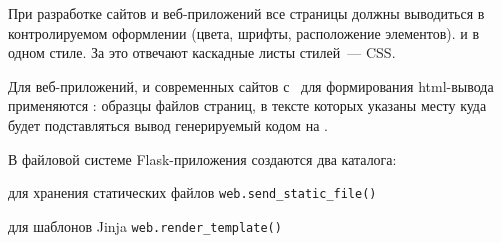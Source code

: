 
При разработке сайтов и веб-приложений все страницы должны выводиться в
контролируемом оформлении (цвета, шрифты, расположение элементов). и в одном
стиле. За это отвечают каскадные листы стилей\ --- CSS.

Для веб-приложений, и современных сайтов с \ для формирования html-вывода
применяются : образцы файлов страниц, в тексте которых указаны
месту куда будет подставляться вывод генерируемый кодом на \py.

В файловой системе Flask-приложения создаются два каталога:
\begin{description}[nosep]
\item[static/] для хранения статических файлов
\verb|web.send_static_file()|
\item[templates/] для шаблонов Jinja \verb|web.render_template()|
\end{description}


